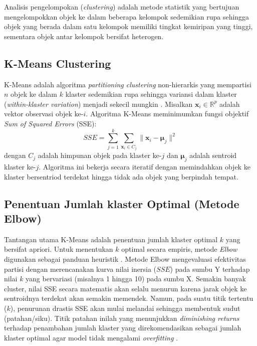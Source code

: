 Analisis pengelompokan (\textit{clustering}) adalah metode statistik yang bertujuan mengelompokkan objek ke dalam beberapa kelompok sedemikian rupa sehingga objek yang berada dalam satu kelompok memiliki tingkat kemiripan yang tinggi, sementara objek antar kelompok bersifat heterogen.

\subsection{\normalsize K-Means Clustering}

K-Means adalah algoritma \textit{partitioning clustering} non-hierarkis yang mempartisi $n$ objek ke dalam $k$ klaster sedemikian rupa sehingga variansi dalam klaster (\textit{within-klaster variation}) menjadi sekecil mungkin \citep{macqueen1967}. Misalkan $\mathbf{x}_i \in \mathbb{R}^p$ adalah vektor observasi objek ke-$i$. Algoritma K-Means meminimumkan fungsi objektif \textit{Sum of Squared Errors} (SSE):
\begin{equation}
  SSE = \sum_{j=1}^{k} \sum_{\mathbf{x}_i \in C_j} \| \mathbf{x}_i - \boldsymbol{\mu}_j \|^2
\end{equation}
dengan $C_j$ adalah himpunan objek pada klaster ke-$j$ dan $\boldsymbol{\mu}_j$ adalah sentroid klaster ke-$j$. Algoritma ini bekerja secara iteratif dengan memindahkan objek ke klaster bersentriod terdekat hingga tidak ada objek yang berpindah tempat.

\subsection{\normalsize Penentuan Jumlah klaster Optimal (Metode Elbow)}\label{subsec:elbow}

Tantangan utama K-Means adalah penentuan jumlah klaster optimal $k$ yang bersifat apriori. Untuk menentukan $k$ optimal secara empiris, metode \textit{Elbow} digunakan sebagai panduan heuristik \citep{bholowalia2014}. Metode Elbow mengevaluasi efektivitas partisi dengan merencanakan kurva nilai inersia ($SSE$) pada sumbu Y terhadap nilai $k$ yang bervariasi (misalnya 1 hingga 10) pada sumbu X. Semakin banyak cluster, nilai SSE secara matematis akan selalu menurun karena jarak objek ke sentroidnya terdekat akan semakin memendek. Namun, pada suatu titik tertentu ($k$), penurunan drastis SSE akan mulai melandai sehingga membentuk sudut (patahan/siku). Titik patahan inilah yang menunjukkan \textit{diminishing returns} terhadap penambahan jumlah klaster yang direkomendasikan sebagai jumlah klaster optimal agar model tidak mengalami \textit{overfitting} \citep{syakur2018}.

